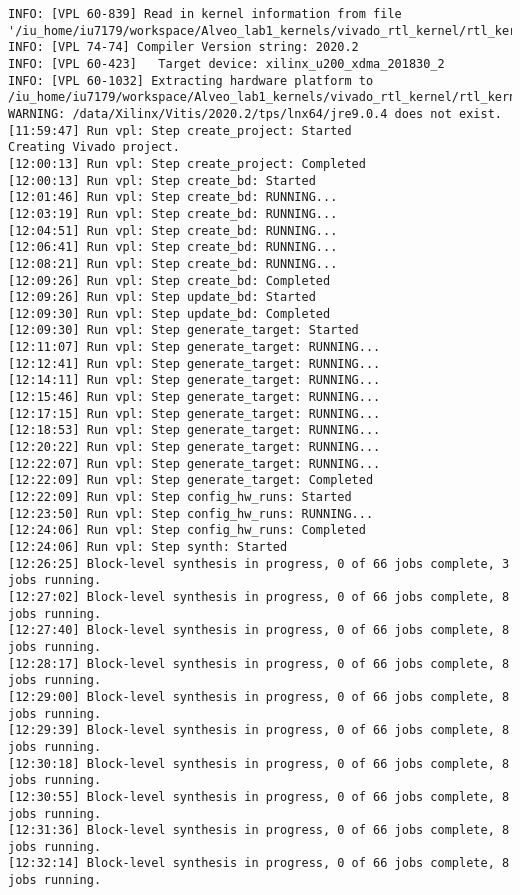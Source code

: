 \begin{lstlisting}[label=func,breaklines=true,breakatwhitespace=false,caption=СОДЕРЖИМОЕ LOG-ФАЙЛА.]
INFO: [VPL 60-839] Read in kernel information from file '/iu_home/iu7179/workspace/Alveo_lab1_kernels/vivado_rtl_kernel/rtl_kernel_wizard_0_ex/exports/_x/link/int/kernel_info.dat'.
INFO: [VPL 74-74] Compiler Version string: 2020.2
INFO: [VPL 60-423]   Target device: xilinx_u200_xdma_201830_2
INFO: [VPL 60-1032] Extracting hardware platform to /iu_home/iu7179/workspace/Alveo_lab1_kernels/vivado_rtl_kernel/rtl_kernel_wizard_0_ex/exports/_x/link/vivado/vpl/.local/hw_platform
WARNING: /data/Xilinx/Vitis/2020.2/tps/lnx64/jre9.0.4 does not exist.
[11:59:47] Run vpl: Step create_project: Started
Creating Vivado project.
[12:00:13] Run vpl: Step create_project: Completed
[12:00:13] Run vpl: Step create_bd: Started
[12:01:46] Run vpl: Step create_bd: RUNNING...
[12:03:19] Run vpl: Step create_bd: RUNNING...
[12:04:51] Run vpl: Step create_bd: RUNNING...
[12:06:41] Run vpl: Step create_bd: RUNNING...
[12:08:21] Run vpl: Step create_bd: RUNNING...
[12:09:26] Run vpl: Step create_bd: Completed
[12:09:26] Run vpl: Step update_bd: Started
[12:09:30] Run vpl: Step update_bd: Completed
[12:09:30] Run vpl: Step generate_target: Started
[12:11:07] Run vpl: Step generate_target: RUNNING...
[12:12:41] Run vpl: Step generate_target: RUNNING...
[12:14:11] Run vpl: Step generate_target: RUNNING...
[12:15:46] Run vpl: Step generate_target: RUNNING...
[12:17:15] Run vpl: Step generate_target: RUNNING...
[12:18:53] Run vpl: Step generate_target: RUNNING...
[12:20:22] Run vpl: Step generate_target: RUNNING...
[12:22:07] Run vpl: Step generate_target: RUNNING...
[12:22:09] Run vpl: Step generate_target: Completed
[12:22:09] Run vpl: Step config_hw_runs: Started
[12:23:50] Run vpl: Step config_hw_runs: RUNNING...
[12:24:06] Run vpl: Step config_hw_runs: Completed
[12:24:06] Run vpl: Step synth: Started
[12:26:25] Block-level synthesis in progress, 0 of 66 jobs complete, 3 jobs running.
[12:27:02] Block-level synthesis in progress, 0 of 66 jobs complete, 8 jobs running.
[12:27:40] Block-level synthesis in progress, 0 of 66 jobs complete, 8 jobs running.
[12:28:17] Block-level synthesis in progress, 0 of 66 jobs complete, 8 jobs running.
[12:29:00] Block-level synthesis in progress, 0 of 66 jobs complete, 8 jobs running.
[12:29:39] Block-level synthesis in progress, 0 of 66 jobs complete, 8 jobs running.
[12:30:18] Block-level synthesis in progress, 0 of 66 jobs complete, 8 jobs running.
[12:30:55] Block-level synthesis in progress, 0 of 66 jobs complete, 8 jobs running.
[12:31:36] Block-level synthesis in progress, 0 of 66 jobs complete, 8 jobs running.
[12:32:14] Block-level synthesis in progress, 0 of 66 jobs complete, 8 jobs running.

\end{lstlisting}
